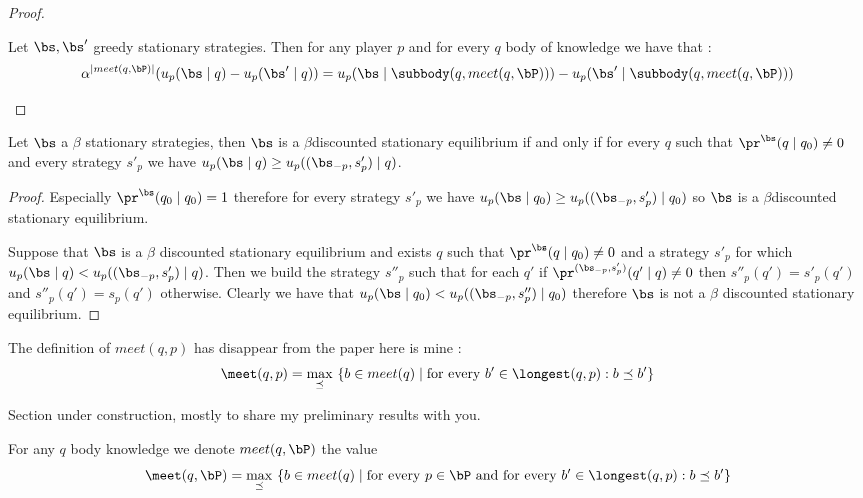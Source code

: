\begin{proof}
\begin{mylem}
	\label{lemsup}
	Let $\bs, \bs'$ greedy stationary strategies. Then for any player $p$ and for every $q$ body of knowledge we have that :  $$\alpha^{|meet(q,\bP)|} (u_p(\bs \mid q) - u_p(\bs' \mid q))  =  u_p(\bs \mid \subbody(q,meet(q,\bP))) - u_p(\bs' \mid \subbody(q,meet(q,\bP)))$$ 
\end{mylem}

\end{proof}

\iffalse

\begin{mylem}
	Let $\bs$ a $\beta$ stationary strategies, then $\bs$ is a $\beta $discounted stationary equilibrium if and only if for every $q$ such that $\pr^{\bs}(q \mid q_0) \neq 0$ and every strategy $s'_p$ we have $u_p(\bs \mid q) \geq u_p((\bs_{-p},s'_p) \mid q)$.
\end{mylem}
\begin{proof}
	Especially $\pr^{\bs}(q_0 \mid q_0) = 1$ therefore for every strategy $s'_p$ we have $u_p(\bs \mid q_0) \geq u_p((\bs_{-p},s'_p) \mid q_0)$ so $\bs$ is a $\beta $discounted stationary equilibrium.
	
	Suppose that $\bs$ is a $\beta$ discounted stationary equilibrium and exists $q$ such that $\pr^{\bs}(q \mid q_0) \neq 0$ and a strategy $s'_p$ for which $u_p(\bs \mid q) < u_p((\bs_{-p},s'_p) \mid q)$.
	Then we build the strategy $s''_p$ such that for each $q'$ if $\pr^{(\bs_{-p},s'_p)}(q' \mid q) \neq 0$ then $s''_p(q') = s'_p(q')$ and $s''_p(q') = s_p(q')$ otherwise. Clearly we have that $u_p(\bs \mid q_0) < u_p((\bs_{-p},s''_p) \mid q_0)$ therefore $\bs$ is not a $\beta$ discounted stationary equilibrium.
\end{proof}

The definition of $meet(q,p)$ has disappear from the paper here is mine :  
$$\meet(q,p)  =  {\displaystyle \max_{\preceq} \ \{b \in meet(q) \mid  \text{for every } b' \in \longest(q,p): b \preceq b'\}}$$

Section under construction, mostly to share my preliminary results with you.

For any $q$ body knowledge we denote
$meet(q,\bP)$ the value $$\meet(q,\bP)  =  {\displaystyle \max_{\preceq} \ \{b \in meet(q) \mid \text{for every } p\in \bP \text{ and for every } b' \in \longest(q,p): b \preceq b'\}}$$



